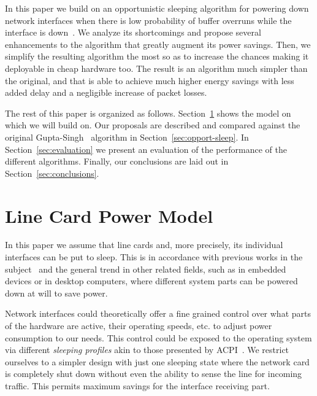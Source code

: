 \documentclass[conference,english]{IEEEtran}
\begin{document}
In this paper we build on an opportunistic sleeping algorithm for powering
down network interfaces when there is low probability of buffer overruns while
the interface is down~\cite{gupta07:_using_low_power_modes_for}. We analyze
its shortcomings and propose several enhancements to the algorithm that
greatly augment its power savings. Then, we simplify the resulting algorithm
the most so as to increase the chances making it deployable in cheap hardware
too. The result is an algorithm much simpler than the original, and that is
able to achieve much higher energy savings with less added delay and a
negligible increase of packet losses.

The rest of this paper is organized as follows. Section~\ref{sec:power-model}
shows the model on which we will build on. Our proposals are described and
compared against the original
Gupta-Singh~\cite{gupta07:_using_low_power_modes_for} algorithm in
Section~\ref{sec:opport-sleep}. In Section~\ref{sec:evaluation} we present an
evaluation of the performance of the different algorithms. Finally, our
conclusions are laid out in Section~\ref{sec:conclusions}.

\section{Line Card Power Model}
\label{sec:power-model}

In this paper we assume that line cards and, more precisely, its individual
interfaces can be put to sleep. This is in accordance with previous works in
the
subject~\cite{gupta07:_using_low_power_modes_for,gupta04:_feasib_study_for_power_manag,nedevschi08:_reduc_networ_energ_consum_via}
and the general trend in other related fields, such as in embedded devices or
in desktop computers, where different system parts can be powered down at will
to save power.

Network interfaces could theoretically offer a fine grained control over what
parts of the hardware are active, their operating speeds, etc. to adjust power
consumption to our needs. This control could be exposed to the operating
system via different \emph{sleeping profiles} akin to those presented by
ACPI~\cite{06:_advan_config_and_power_inter_specif}. We restrict ourselves to
a simpler design with just one sleeping state where the network card is
completely shut down without even the ability to sense the line for incoming
traffic. This permits maximum savings for the interface receiving part.
\end{document}
